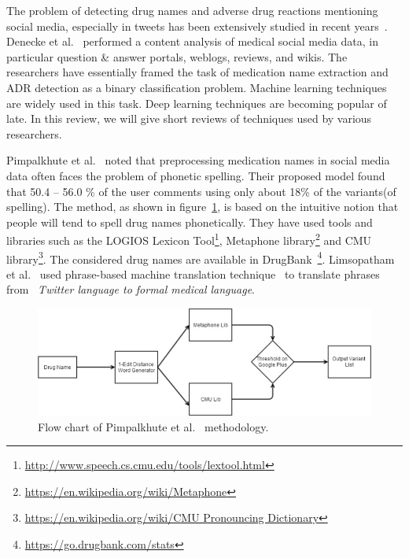 The problem of detecting drug names and adverse drug reactions mentioning social media, especially in tweets has been extensively studied in recent years~\cite{weissenbacher2018overview}. Denecke et al.~\cite{DENECKE20091870} performed a content analysis of medical social media data, in particular question \& answer portals, weblogs, reviews, and wikis. The researchers have essentially framed the task of medication name extraction and ADR detection as a binary classification problem. Machine learning techniques are widely used in this task. Deep learning techniques are becoming popular of late. In this review, we will give short reviews of techniques used by various researchers.

Pimpalkhute et al.~\cite{pimpalkhute2014phonetic} noted that preprocessing medication names in social media data often faces the problem of phonetic spelling. Their proposed model found that 50.4 – 56.0 \% of the user comments using only about 18\% of the variants(of spelling). The method, as shown in figure~\ref{fig:model-pimpalkhute}, is based on the intuitive notion that people will tend to spell drug names phonetically. They have used tools and libraries such as the LOGIOS Lexicon Tool\footnote{\url{http://www.speech.cs.cmu.edu/tools/lextool.html}}, Metaphone library\footnote{\url{https://en.wikipedia.org/wiki/Metaphone}} and CMU library\footnote{\url{https://en.wikipedia.org/wiki/CMU Pronouncing Dictionary}}. The considered drug names are available in DrugBank~\footnote{\url{https://go.drugbank.com/stats}}. Limsopatham et al.~\cite{limsopatham2015adapting} used phrase-based machine translation technique~\cite{koehn2003statistical} to translate phrases from ~\textit{Twitter language to formal medical language}.

\begin{figure}[h]
	\centering
	\includegraphics[width=0.99\linewidth]{Figures/m.png}
	\caption{Flow chart of Pimpalkhute et al.~\cite{pimpalkhute2014phonetic} methodology.}
	\label{fig:model-pimpalkhute}
\end{figure}

